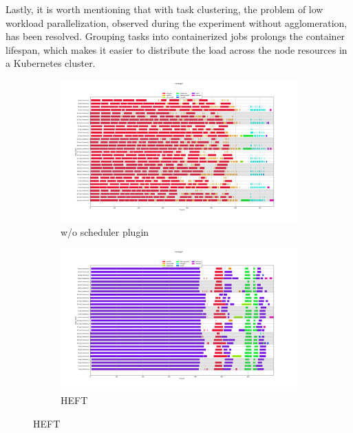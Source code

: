 Lastly, it is worth mentioning that with task clustering, the problem of low workload parallelization, observed during the experiment without agglomeration, has been resolved.
Grouping tasks into containerized jobs prolongs the container lifespan, which makes it easier to distribute the load across the node resources in a Kubernetes cluster.


\begin{figure}[H]
\begin{subfigure}{0.75\textwidth}
\centering
\includegraphics[width=1\linewidth]{figures/6-2-m1.0-agglo-empty.png}
\caption[Selected example execution trace for Montage2-v1.0 workflow with task clustering and no scheduler plugin]{w/o scheduler plugin}
\label{fig:evaluation:agglo:m10:empty}
\end{subfigure}
\begin{subfigure}{0.75\textwidth}
\centering
\includegraphics[width=1\linewidth]{figures/6-2-m1.0-agglo-heft.png}
\caption[Selected example execution traces for Montage2-v1.0 workflow with HEFT and task clustering]{HEFT}

\end{subfigure}
\end{figure}
